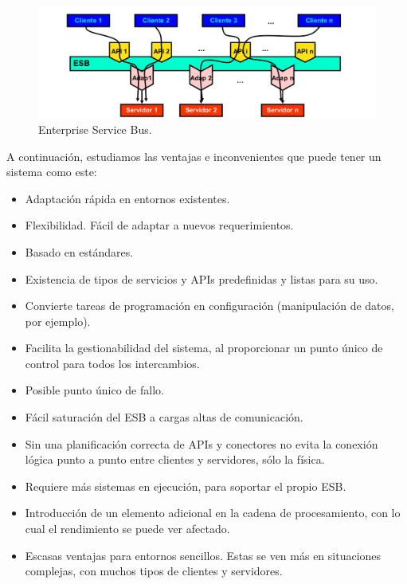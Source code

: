 \begin{figure}[hbtp]
\centering
\includegraphics[width=1\textwidth]{img/ESB.png}
\caption{Enterprise Service Bus.}
\label{ESB}
\end{figure}

A continuación, estudiamos las ventajas e inconvenientes que puede tener un sistema como este:
\begin{itemize}
\item Adaptación rápida en entornos existentes.
\item Flexibilidad. Fácil de adaptar a nuevos requerimientos.
\item Basado en estándares.
\item Existencia de tipos de servicios y APIs predefinidas y listas para su uso.
\item Convierte tareas de programación en configuración (manipulación de datos, por ejemplo).
\item Facilita la gestionabilidad del sistema, al proporcionar un punto único de control para todos los intercambios.
\end{itemize}
\begin{itemize}
\item Posible punto único de fallo.
\item Fácil saturación del ESB a cargas altas de comunicación.
\item Sin una planificación correcta de APIs y conectores no evita la conexión lógica punto a punto entre clientes y servidores, sólo la física.
\item Requiere más sistemas en ejecución, para soportar el propio ESB.
\item Introducción de un elemento adicional en la cadena de procesamiento, con lo cual el rendimiento se puede ver afectado.
\item Escasas ventajas para entornos sencillos. Estas se ven más en situaciones complejas, con muchos tipos de clientes y servidores.
\end{itemize}

